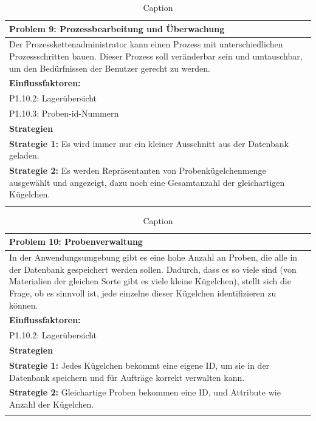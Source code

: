 \documentclass[enabledeprecatedfontcommands,fontsize=12pt,paper=a4,twoside]{scrartcl}
\begin{document}
\begin{table}[]
    \centering
    \begin{tabular}{|p{15cm}|}
    \hline
          \textbf{Problem 9:} Prozessbearbeitung und Überwachung
          \\ \hline
          Der Prozesskettenadministrator kann einen Prozess mit unterschiedlichen Prozessschritten bauen. Dieser Prozess soll veränderbar sein und umtauschbar, um den Bedürfnissen der Benutzer gerecht zu werden.

          \\ \hline
          \textbf{Einflussfaktoren: } \\
          P1.10.2: Lagerübersicht \\
	 P1.10.3: Proben-id-Nummern \\
          \hline
          \textbf{Strategien} \\ \hline
          \textbf{Strategie 1:} Es wird immer nur ein kleiner Ausschnitt aus der Datenbank geladen. \\
         \textbf{Strategie 2:} Es werden Repräsentanten von Probenkügelchenmenge ausgewählt und angezeigt, dazu noch eine Gesamtanzahl der gleichartigen Kügelchen. \\
          \\ \hline
    \end{tabular}
    \caption{Caption}
    \label{tab:my_label}
\end{table}

\begin{table}[]
    \centering
    \begin{tabular}{|p{15cm}|}
    \hline
          \textbf{Problem 10:} Probenverwaltung
          \\ \hline
         In der Anwendungsumgebung gibt es eine hohe Anzahl an Proben, die alle in der Datenbank gespeichert werden sollen. Dadurch, dass es so viele sind (von Materialien der gleichen Sorte gibt es viele kleine Kügelchen), stellt sich die Frage, ob es sinnvoll ist, jede einzelne dieser Kügelchen identifizieren zu können.
          \\ \hline
          \textbf{Einflussfaktoren: } \\
          P1.10.2: Lagerübersicht \\
          \hline
          \textbf{Strategien} \\ \hline
          \textbf{Strategie 1:} Jedes Kügelchen bekommt eine eigene ID, um sie in der Datenbank speichern und für Aufträge korrekt verwalten kann.\\
         \textbf{Strategie 2:} Gleichartige Proben bekommen eine ID, und Attribute wie Anzahl der Kügelchen. \\
          \\ \hline
    \end{tabular}
    \caption{Caption}
    \label{tab:my_label}
\end{table}
\end{document}
